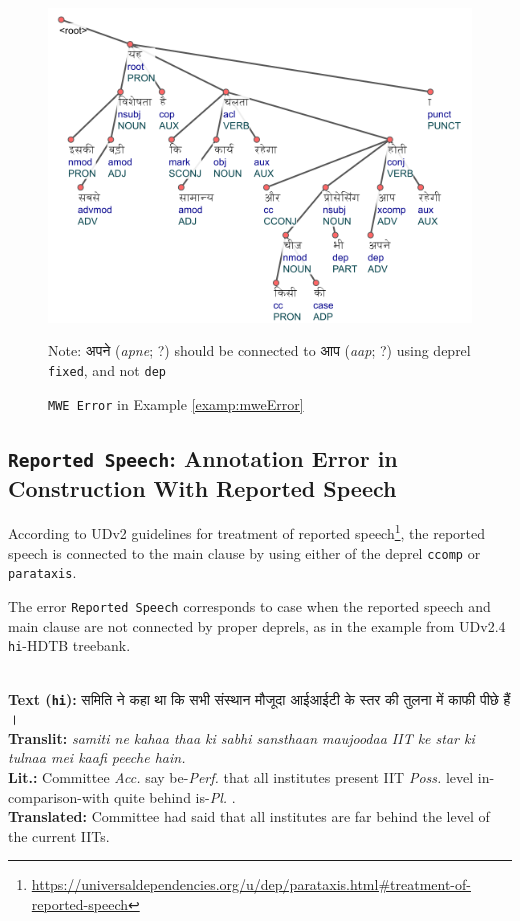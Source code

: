 \begin{figure}[H]
    \centering
    \includegraphics[scale=0.90]{img/mweError.png}
    \caption{\texttt{MWE Error} in Example \ref{examp:mweError}}
    Note: \texthindi{अपने} (\textit{apne}; ?) should be connected to \texthindi{आप} (\textit{aap}; ?) using deprel \texttt{fixed}, and not \texttt{dep}
    \label{examp:mweError-fig}
\end{figure}

\subsection[Annotation Error in Construction With Reported Speech: \texttt{Reported Speech}]{\texttt{Reported Speech}: Annotation Error in Construction With Reported Speech}

According to UDv2 guidelines for treatment of reported speech\footnote{\url{https://universaldependencies.org/u/dep/parataxis.html\#treatment-of-reported-speech}}, the reported speech is connected to the main clause by using either of the deprel \texttt{ccomp} or \texttt{parataxis}.

The error \texttt{Reported Speech} corresponds to case when the reported speech and main clause are not connected by proper deprels, as in the example from UDv2.4 \texttt{hi}-HDTB treebank.

\begin{example}
\label{examp:reportedSpeech}
\textbf{ }\\
\textbf{Text (\texttt{hi}):} \texthindi{समिति ने कहा था कि सभी संस्थान मौजूदा आईआईटी के स्तर की तुलना में काफी पीछे हैं ।}\\
\textbf{Translit:} \textit{samiti ne kahaa thaa ki sabhi sansthaan maujoodaa IIT ke star ki tulnaa mei kaafi peeche hain.}\\
\textbf{Lit.:} Committee \textit{Acc.} say be-\textit{Perf.} that all institutes present IIT \textit{Poss.} level in-comparison-with quite behind is-\textit{Pl.} . \\
\textbf{Translated:} Committee had said that all institutes are far behind the level of the current IITs. 
\end{example}

